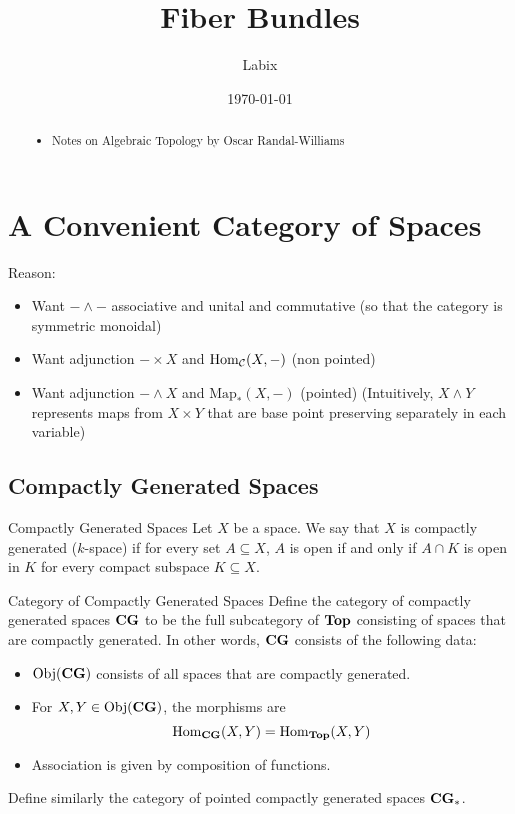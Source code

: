 \documentclass[a4paper]{article}
\title{Fiber Bundles}
\author{Labix}
\date{\today}
\begin{document}
\maketitle
\begin{abstract}
\begin{itemize}
\item Notes on Algebraic Topology by Oscar Randal-Williams
\end{itemize}
\end{abstract}
\pagebreak
\tableofcontents

\pagebreak
\section{A Convenient Category of Spaces}
Reason: 
\begin{itemize}
\item Want $-\wedge-$ associative and unital and commutative (so that the category is symmetric monoidal)
\item Want adjunction $-\times X$ and $\operatorname{Hom}_{\mathcal{C}}(X,-)$ (non pointed)
\item Want adjunction $-\wedge X$ and $\text{Map}_\ast(X,-)$ (pointed) (Intuitively, $X\wedge Y$ represents maps from $X\times Y$ that are base point preserving separately in each variable)
\end{itemize}


\subsection{Compactly Generated Spaces}
\begin{defn}{Compactly Generated Spaces}{} Let $X$ be a space. We say that $X$ is compactly generated ($k$-space) if for every set $A\subseteq X$, $A$ is open if and only if $A\cap K$ is open in $K$ for every compact subspace $K\subseteq X$. 
\end{defn}

\begin{defn}{Category of Compactly Generated Spaces}{} Define the category of compactly generated spaces $\bold{CG}$ to be the full subcategory of $\bold{Top}$ consisting of spaces that are compactly generated. In other words, $\bold{CG}$ consists of the following data: 
\begin{itemize}
\item $\text{Obj}(\bold{CG})$ consists of all spaces that are compactly generated. 
\item For $X,Y\in\text{Obj}(\bold{CG})$, the morphisms are $$\operatorname{Hom}_{\bold{CG}}(X,Y)=\operatorname{Hom}_{\bold{Top}}(X,Y)$$
\item Association is given by composition of functions. 
\end{itemize}
Define similarly the category of pointed compactly generated spaces $\bold{CG}_\ast$. 
\end{defn}
\end{document}
